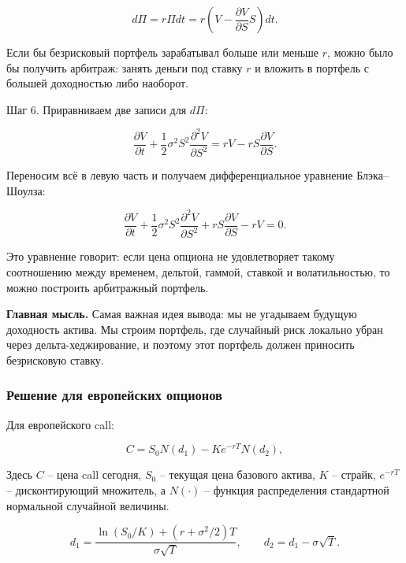 \documentclass[11pt,a4paper]{article}
\newcommand{\key}[1]{%
  \vspace{0.15em}
  \noindent\colorbox{softblue}{%
    \parbox{\dimexpr\linewidth-2\fboxsep\relax}{\textbf{Главная мысль.} #1}%
  }\vspace{0.2em}
}
\begin{document}
\begin{equation}
d\Pi = r\Pi dt = r\left(V-\frac{\partial V}{\partial S}S\right)dt.
\end{equation}

Если бы безрисковый портфель зарабатывал больше или меньше $r$, можно было бы получить арбитраж: занять деньги под ставку $r$ и вложить в портфель с большей доходностью либо наоборот.

Шаг 6. Приравниваем две записи для $d\Pi$:

\begin{equation}
\frac{\partial V}{\partial t}
+\frac{1}{2}\sigma^2S^2
\frac{\partial^2V}{\partial S^2}
=
rV-rS\frac{\partial V}{\partial S}.
\end{equation}

Переносим всё в левую часть и получаем дифференциальное уравнение Блэка--Шоулза:

\begin{equation}
\frac{\partial V}{\partial t}
+
\frac{1}{2}\sigma^2 S^2
\frac{\partial^2 V}{\partial S^2}
+
rS\frac{\partial V}{\partial S}
-rV=0.
\end{equation}

Это уравнение говорит: если цена опциона не удовлетворяет такому соотношению между временем, дельтой, гаммой, ставкой и волатильностью, то можно построить арбитражный портфель.

\key{Самая важная идея вывода: мы не угадываем будущую доходность актива. Мы строим портфель, где случайный риск локально убран через дельта-хеджирование, и поэтому этот портфель должен приносить безрисковую ставку.}

\subsubsection{Решение для европейских опционов}

Для европейского call:

\begin{equation}
C=S_0N(d_1)-Ke^{-rT}N(d_2),
\end{equation}

Здесь $C$ -- цена call сегодня, $S_0$ -- текущая цена базового актива, $K$ -- страйк, $e^{-rT}$ -- дисконтирующий множитель, а $N(\cdot)$ -- функция распределения стандартной нормальной случайной величины.

\begin{equation}
d_1 =
\frac{\ln(S_0/K)+(r+\sigma^2/2)T}{\sigma\sqrt{T}},
\qquad
d_2=d_1-\sigma\sqrt{T}.
\end{equation}
\end{document}
